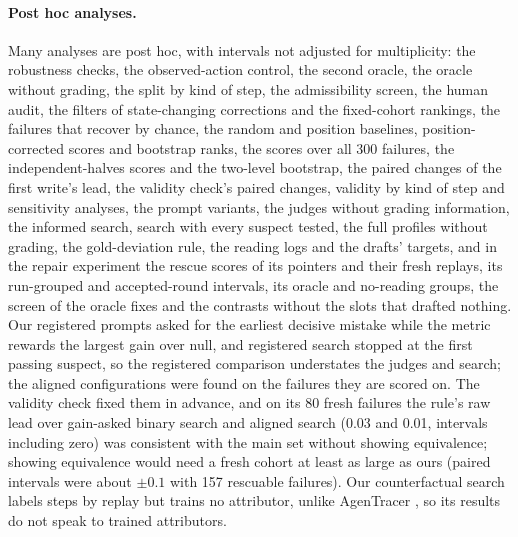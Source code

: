 \documentclass[11pt]{article}
\begin{document}
\paragraph{Post hoc analyses.} Many analyses are post hoc, with intervals not adjusted for multiplicity: the robustness checks, the observed-action control, the second oracle, the oracle without grading, the split by kind of step, the admissibility screen, the human audit, the filters of state-changing corrections and the fixed-cohort rankings, the failures that recover by chance, the random and position baselines, position-corrected scores and bootstrap ranks, the scores over all 300 failures, the independent-halves scores and the two-level bootstrap, the paired changes of the first write's lead, the validity check's paired changes, validity by kind of step and sensitivity analyses, the prompt variants, the judges without grading information, the informed search, search with every suspect tested, the full profiles without grading, the gold-deviation rule, the reading logs and the drafts' targets, and in the repair experiment the rescue scores of its pointers and their fresh replays, its run-grouped and accepted-round intervals, its oracle and no-reading groups, the screen of the oracle fixes and the contrasts without the slots that drafted nothing. Our registered prompts asked for the earliest decisive mistake while the metric rewards the largest gain over null, and registered search stopped at the first passing suspect, so the registered comparison understates the judges and search; the aligned configurations were found on the failures they are scored on. The validity check fixed them in advance, and on its 80 fresh failures the rule's raw lead over gain-asked binary search and aligned search (0.03 and 0.01, intervals including zero) was consistent with the main set without showing equivalence; showing equivalence would need a fresh cohort at least as large as ours (paired intervals were about $\pm0.1$ with 157 rescuable failures). Our counterfactual search labels steps by replay but trains no attributor, unlike AgenTracer \citep{zhang2026agentracer}, so its results do not speak to trained attributors.
\end{document}
